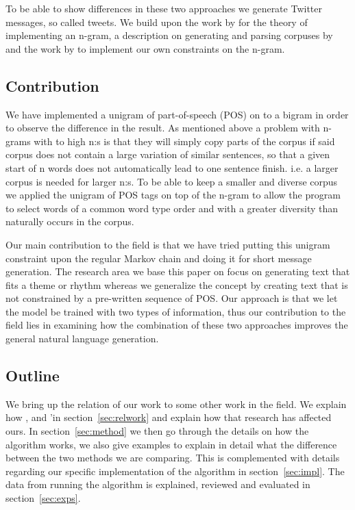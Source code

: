 \documentclass[a4paper,12pt]{article}
\begin{document}
To be able to show differences in these two approaches we generate Twitter messages, so called tweets. 
We build upon the work by \cite{shannon48} for the theory of implementing an n-gram, a description on generating and parsing corpuses by \citep{Corpus}
and the work by \citealp{McBarb} to implement our own constraints on the n-gram.
   
\subsection{Contribution}

We have implemented a unigram of part-of-speech (POS) on to a bigram in order to observe the difference in the result. 
As mentioned above a problem with n-grams with to high n:s is that they will simply copy parts of the corpus if said corpus does not contain a large variation of similar sentences, 
so that a given start of n words does not automatically lead to one sentence finish. i.e. a larger corpus is needed for larger n:s.
To be able to keep a smaller and diverse corpus we applied the unigram of POS tags on top of the n-gram to allow the program to select words of a common word type order and with a greater diversity than naturally occurs in the corpus.

Our main contribution to the field is that we have tried putting this unigram constraint upon the regular Markov chain and doing it for short message generation.
The research area we base this paper on focus on generating text that fits a theme or rhythm whereas we generalize the concept by creating text that is not constrained by a pre-written sequence of POS. 
Our approach is that we let the model be trained with two types of information, thus our contribution to the field lies in examining how the combination of these two approaches improves the general natural language generation.



\subsection{Outline}
We bring up the relation of our work to some other work in the field. We explain how \citep{shannon48}, \citep{Corpus} and \cite{McBarb}'in section~\ref{sec:relwork} and explain how that research has affected ours. 
In section~\ref{sec:method} we then go through the details on how the algorithm works, 
we also give examples to explain in detail what the difference between the two methods we are comparing. 
This is complemented with details regarding our specific implementation of the algorithm in section~\ref{sec:impl}. 
The data from running the algorithm is explained, reviewed and evaluated in section~\ref{sec:exps}.
\end{document}
